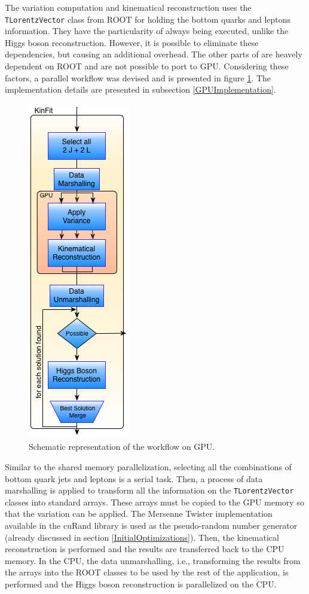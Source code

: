 The variation computation and kinematical reconstruction uses the \texttt{TLorentzVector} class from ROOT for holding the bottom quarks and leptons information. They have the particularity of always being executed, unlike the Higgs boson reconstruction. However, it is possible to eliminate these dependencies, but causing an additional overhead. The other parts of \ttDilepKinFit are heavely dependent on ROOT and are not possible to port to GPU. Considering these factors, a parallel workflow was devised and is presented in figure \ref{fig:GPUPipeline}. The implementation details are presented in subsection \ref{GPUImplementation}. 

\begin{figure}[!htp]
	\begin{center}
		\includegraphics[scale=0.6]{../../common/img/gpu_pipeline.png}
		\caption{Schematic representation of the \ttDilepKinFit workflow on GPU.}
		\label{fig:GPUPipeline}
	\end{center}
\end{figure}

Similar to the shared memory parallelization, selecting all the combinations of bottom quark jets and leptons is a serial task. Then, a process of data marshalling is applied to transform all the information on the \texttt{TLorentzVector} classes into standard arrays. These arrays must be copied to the GPU memory so that the variation can be applied. The Mersenne Twister implementation available in the \nvidia cuRand library is used as the pseudo-random number generator (already discussed in section \ref{InitialOptimizations}). Then, the kinematical reconstruction is performed and the results are transferred back to the CPU memory. In the CPU, the data unmarshalling, i.e., transforming the results from the arrays into the ROOT classes to be used by the rest of the application, is performed and the Higgs boson reconstruction is parallelized on the CPU.

